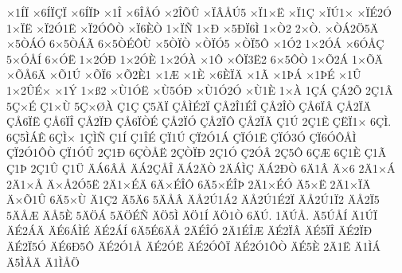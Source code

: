 {^^d71^^cd^^cf
^^d76^^cd^^cf^^c7^^cf
^^d76^^cd^^cf^^de
^^d71^^ce
^^d76^^ce^^c5^^d3
^^d72^^ce^^d5^^db
^^d7^^cf^^c2^^c5^^da5
^^d7^^cf1^^d7^^cb
^^d7^^cf1^^c7
^^d7^^cf^^da1^^d7
^^d7^^cf^^c92^^d3
1^^d7^^cf^^cb
^^d7^^cf2^^d31^^cb
^^d7^^cf2^^d3^^d4^^d2
^^d7^^cf6^^c8^^d2
1^^d7^^cf^^d1
1^^d7^^d0
^^d75^^d0^^cf6^^cc
1^^d7^^d22
2^^d7^^d2.
^^d7^^d2^^c12^^d65^^c4
^^d75^^d2^^c1^^d3
6^^d75^^d2^^c1^^c3
6^^d75^^d2^^c9^^d4^^d9
^^d75^^d2^^cf^^d2
^^d7^^d2^^cf^^d35
^^d7^^d2^^cf5^^d4
^^d71^^d32
1^^d72^^d3^^c1
^^d76^^d3^^c5^^c7
5^^d7^^d3^^c5^^cd
6^^d7^^d3^^cb
1^^d72^^d3^^d0
1^^d72^^d3^^c8
1^^d72^^d3^^c0
^^d71^^d4
^^d7^^d4^^cf3^^cb2
6^^d75^^d4^^d2
1^^d7^^d52^^c1
1^^d7^^d5^^c4
^^d7^^d5^^c56^^c4
^^d7^^d51^^da
^^d7^^d5^^cf6
^^d7^^d52^^c81
^^d71^^c6
^^d71^^c8
^^d76^^c8^^cf^^c4
^^d71^^c3
^^d71^^de^^c1
^^d71^^de^^c9
^^d71^^db
1^^d72^^db^^c9^^d7
^^d71^^dd
1^^d7^^df2
^^d7^^d91^^d3^^cb
^^d7^^d95^^d3^^d0
^^d7^^d91^^d32^^d3
^^d7^^d91^^c8
1^^d7^^c0
1^^c7^^c1
^^c7^^c12^^d5
2^^c71^^c2
5^^c7^^d7^^c9
^^c71^^d7^^d9
5^^c7^^d7^^d8^^c0
^^c71^^c7
^^c75^^c4^^cf
^^c7^^c5^^cc^^c92^^cf
^^c7^^c52^^ce1^^c9^^ce
^^c7^^c52^^ce^^d2
^^c7^^c56^^cf^^c2
^^c7^^c52^^cf^^c4
^^c7^^c56^^cf^^cb
^^c7^^c56^^cf^^ce
^^c7^^c52^^cf^^d0
^^c7^^c56^^cf^^d2^^c9
^^c7^^c52^^cf^^d3
^^c7^^c52^^cf^^d4
^^c7^^c52^^cf^^c3
^^c71^^da
2^^c71^^cb
^^c7^^cb^^cf1^^d7
6^^c7^^cc.
6^^c75^^cc^^c1^^ca
6^^c7^^cc^^d7
1^^c7^^cc^^d1
^^c71^^cd
^^c71^^ce^^c9
^^c7^^cf1^^da
^^c7^^cf2^^d31^^c1
^^c7^^cf^^d31^^cb
^^c7^^cf^^d33^^d3
^^c7^^cf6^^d3^^d4^^c5^^cc
^^c7^^cf2^^d31^^d4^^d2
^^c7^^cf1^^d3^^db
2^^c71^^d0
6^^c7^^d2^^c5^^cb
2^^c7^^d2^^cf^^d0
2^^c71^^d3
^^c72^^d3^^c2
2^^c75^^d4
6^^c7^^c6
6^^c71^^c8
^^c71^^c3
^^c71^^de
2^^c71^^db
^^c71^^dc
^^c4^^c16^^c2^^c5
^^c4^^c12^^c7^^c5^^ce
^^c4^^c12^^c4^^d2
2^^c4^^c1^^cc^^c7
^^c4^^c12^^d0^^d2
6^^c41^^c2
^^c4^^d76
2^^c41^^d7^^c1
2^^c41^^d7^^c5
^^c4^^d7^^c52^^d35^^cb
2^^c41^^d7^^c9^^c4
6^^c4^^d7^^c9^^ce^^d4
6^^c45^^d7^^c9^^ce^^de
2^^c41^^d7^^c9^^d3
^^c45^^d7^^cb
2^^c41^^d7^^cf^^c4
^^c4^^d7^^d51^^db
6^^c45^^d7^^d9
^^c41^^c72
^^c45^^c46
5^^c4^^c5^^c2
^^c4^^c52^^da1^^c12
^^c4^^c52^^da1^^c92^^cf
^^c4^^c52^^da1^^cf2
^^c4^^c52^^cf5
5^^c4^^c5^^c6
^^c4^^c55^^c8
5^^c4^^d6^^c1
5^^c4^^d6^^c9^^d1
^^c4^^d65^^cc
^^c4^^d61^^cd
^^c4^^d61^^d2
6^^c4^^da.
1^^c4^^da^^c5.
^^c45^^da^^c5^^cd
^^c41^^da^^cf
^^c4^^c92^^c1^^c4
^^c4^^c96^^c1^^cc^^c9
^^c4^^c92^^c1^^cd
6^^c45^^c96^^c4^^c5
2^^c4^^c9^^ce^^d3
2^^c41^^c9^^ce^^c6
^^c4^^c92^^cf^^c2
^^c4^^c95^^cf^^ce
^^c4^^c92^^cf^^d0
^^c4^^c92^^cf5^^d3
^^c4^^c96^^d05^^d4
^^c4^^c92^^d31^^c5
^^c4^^c92^^d3^^cb
^^c4^^c92^^d3^^d4^^cf
^^c4^^c92^^d31^^d4^^d2
^^c4^^c95^^c8
2^^c41^^cb
^^c41^^cc^^c1
^^c45^^cc^^c5^^c4
^^c41^^cc^^c5^^d6
}
